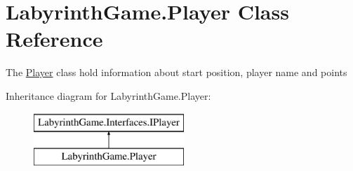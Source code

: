 \hypertarget{class_labyrinth_game_1_1_player}{\section{Labyrinth\+Game.\+Player Class Reference}
\label{class_labyrinth_game_1_1_player}
}


The \hyperlink{class_labyrinth_game_1_1_player}{Player} class hold information about start position, player name and points  


Inheritance diagram for Labyrinth\+Game.\+Player\+:\begin{figure}[H]
\begin{center}
\leavevmode
\includegraphics[height=2.000000cm]{class_labyrinth_game_1_1_player}
\end{center}
\end{figure}
